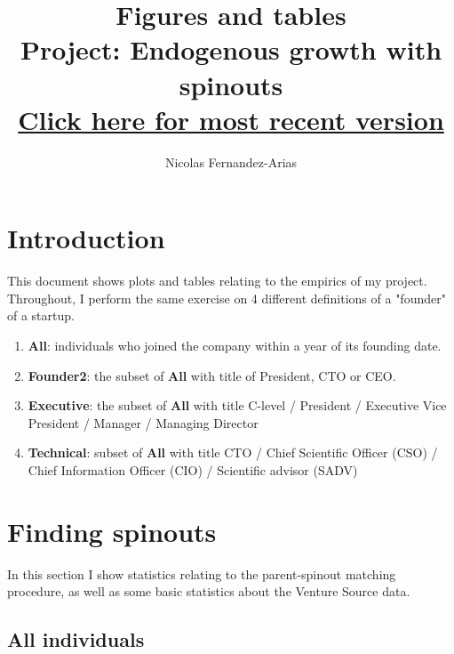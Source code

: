 \documentclass[12pt,english]{article}
\theoremstyle{remark}
\let\Oldsection\section
\renewcommand{\section}{\FloatBarrier\Oldsection}
\let\Oldsubsection\subsection
\renewcommand{\subsection}{\FloatBarrier\Oldsubsection}
\begin{document}
	
\title{Figures and tables\\ \small Project: Endogenous growth with spinouts \\ \href{https://drive.google.com/file/d/16vrZivy1MLKdUfLVawUrpLs475bzAwMg/view?usp=sharing}{Click here for most recent version}}
\author{Nicolas Fernandez-Arias}
\maketitle

\tableofcontents

\section{Introduction}

This document shows plots and tables relating to the empirics of my project. Throughout, I perform the same exercise on 4 different definitions of a "founder" of a startup.

\begin{enumerate}
	\item \textbf{All}: individuals who joined the company within a year of its founding date.
	\item \textbf{Founder2}: the subset of \textbf{All} with title of President, CTO or CEO.
	\item \textbf{Executive}: the subset of \textbf{All} with title C-level / President / Executive Vice President / Manager / Managing Director
	\item \textbf{Technical}: subset of \textbf{All} with title CTO / Chief Scientific Officer (CSO) / Chief Information Officer (CIO) / Scientific advisor (SADV)
\end{enumerate}

\section{Finding spinouts}

In this section I show statistics relating to the parent-spinout matching procedure, as well as some basic statistics about the Venture Source data. 

\pagebreak

\subsection{All individuals}


\pagebreak
\end{document}
